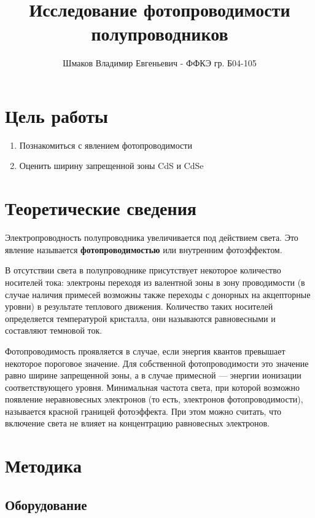 \documentclass[a4paper, 14pt]{article}
\title{\textcolor{main_title}{Исследование фотопроводимости полупроводников}}
\author{Шмаков Владимир Евгеньевич - ФФКЭ гр. Б04-105}
\begin{document}
\maketitle

\section*{\textcolor{header}{Цель работы}}

\begin{enumerate}
    \item Познакомиться с явлением фотопроводимости
    \item Оценить ширину запрещенной зоны CdS и CdSe
\end{enumerate}

\section*{\textcolor{header}{Теоретические сведения}}

	
Электропроводность полупроводника увеличивается под действием света. 
Это явление называется \textcolor{defenition}{\textbf{фотопроводимостью}} или {внутренним фотоэффектом}. 

В отсутствии света в полупроводнике присутствует некоторое количество носителей тока: электроны переходя из валентной зоны в зону проводимости (в случае наличия примесей возможны также переходы с донорных на акцепторные уровни) в результате теплового движения. Количество таких носителей определяется температурой кристалла, они называются равновесными и составляют темновой ток. 

Фотопроводимость проявляется в случае, если энергия квантов превышает некоторое пороговое значение. Для собственной фотопроводимости это значение равно ширине запрещенной зоны, а в случае примесной --- энергии ионизации соответствующего уровня. Минимальная частота света, при которой возможно появление неравновесных электронов (то есть, электронов фотопроводимости), называется красной границей фотоэффекта. При этом можно считать, что включение света не влияет на концентрацию равновесных электронов. 








\section*{\textcolor{header}{Методика}}
\subsection*{\textcolor{sub_header}{Оборудование}}
\end{document}
